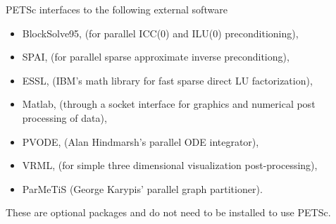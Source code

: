\vspace{.3in}
PETSc interfaces to the following external software
\begin{itemize}
  \item BlockSolve95, (for parallel ICC(0) and ILU(0) preconditioning),
  \item SPAI,         (for parallel sparse approximate inverse preconditiong),
  \item ESSL,         (IBM's math library for fast sparse direct LU factorization),
  \item Matlab,       (through a socket interface for graphics and numerical post processing 
                       of data),
  \item PVODE,        (Alan Hindmarsh's parallel ODE integrator),
  \item VRML,         (for simple three dimensional visualization post-processing),
  \item ParMeTiS      (George Karypis' parallel graph partitioner).
\end{itemize}
These are optional packages and do not need to be installed to use PETSc.


